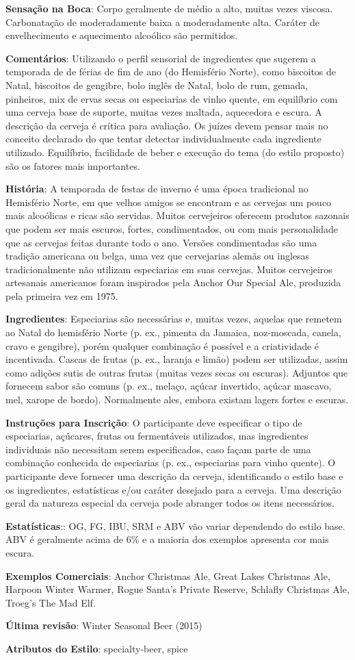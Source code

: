 \textbf{Sensação na Boca}: Corpo geralmente de médio a alto, muitas vezes viscosa. Carbonatação de moderadamente baixa a moderadamente alta. Caráter de envelhecimento e aquecimento alcoólico são permitidos.

\textbf{Comentários}: Utilizando o perfil sensorial de ingredientes que sugerem a temporada de de férias de fim de ano (do Hemisfério Norte), como biscoitos de Natal, biscoitos de gengibre, bolo inglês de Natal, bolo de rum, gemada, pinheiros, mix de ervas secas ou especiarias de vinho quente, em equilíbrio com uma cerveja base de suporte, muitas vezes maltada, aquecedora e escura. A descrição da cerveja é crítica para avaliação. Os juízes devem pensar mais no conceito declarado do que tentar detectar individualmente cada ingrediente utilizado. Equilíbrio, facilidade de beber e execução do tema (do estilo proposto) são os fatores mais importantes.

\textbf{História}: A temporada de festas de inverno é uma época tradicional no Hemisfério Norte, em que velhos amigos se encontram e as cervejas um pouco mais alcoólicas e ricas são servidas. Muitos cervejeiros oferecem produtos sazonais que podem ser mais escuros, fortes, condimentados, ou com mais personalidade que as cervejas feitas durante todo o ano. Versões condimentadas são uma tradição americana ou belga, uma vez que cervejarias alemãs ou inglesas tradicionalmente não utilizam especiarias em suas cervejas. Muitos cervejeiros artesanais americanos foram inspirados pela Anchor Our Special Ale, produzida pela primeira vez em 1975.

\textbf{Ingredientes}: Especiarias são necessárias e, muitas vezes, aquelas que remetem ao Natal do hemisfério Norte (p. ex., pimenta da Jamaica, noz-moscada, canela, cravo e gengibre), porém qualquer combinação é possível e a criatividade é incentivada. Cascas de frutas (p. ex., laranja e limão) podem ser utilizadas, assim como adições sutis de outras frutas (muitas vezes secas ou escuras). Adjuntos que fornecem sabor são comuns (p. ex., melaço, açúcar invertido, açúcar mascavo, mel, xarope de bordo). Normalmente ales, embora existam lagers fortes e escuras.

\textbf{Instruções para Inscrição}: O participante deve especificar o tipo de especiarias, açúcares, frutas ou fermentáveis utilizados, mas ingredientes individuais não necessitam serem especificados, caso façam parte de uma combinação conhecida de especiarias (p. ex., especiarias para vinho quente). O participante deve fornecer uma descrição da cerveja, identificando o estilo base e os ingredientes, estatísticas e/ou caráter desejado para a cerveja. Uma descrição geral da natureza especial da cerveja pode abranger todos os itens necessários.

\textbf{Estatísticas}:: OG, FG, IBU, SRM e ABV vão variar dependendo do estilo base. ABV é geralmente acima de 6\% e a maioria dos exemplos apresenta cor mais escura.

\textbf{Exemplos Comerciais}: Anchor Christmas Ale, Great Lakes Christmas Ale, Harpoon Winter Warmer, Rogue Santa's Private Reserve, Schlafly Christmas Ale, Troeg's The Mad Elf.

\textbf{Última revisão}: Winter Seasonal Beer (2015)

\textbf{Atributos do Estilo}: specialty-beer, spice
